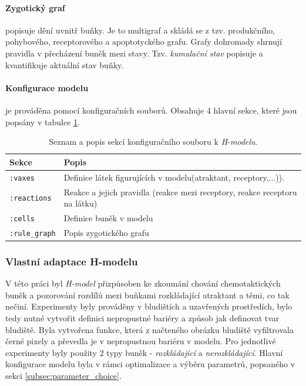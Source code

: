 \documentclass[10pt,a4paper,twocolumn]{article}
\begin{document}
\paragraph{Zygotický graf} popisuje dění uvnitř buňky. Je to multigraf a skládá se z tzv. produkčního, pohybového, receptorového a apoptotyckého grafu. Grafy dohromady shrnují pravidla v přecházení buněk mezi stavy. Tzv. \textit{kumulační stav} popisuje a kvantifikuje aktuální stav buňky.

\paragraph{Konfigurace modelu} je prováděna pomocí konfiguračních souborů. Obsahuje 4 hlavní sekce, které jsou popsány v tabulce \ref{table:sekce}.


\begin{table}[t]
  \centering %
  \begin{tabular}{l p{5cm}}
  \toprule
  Sekce & Popis \\
  \midrule
    \texttt{:vaxes} & Definice látek figurujících v modelu(atraktant, receptory,...)). \\
    \texttt{:reactions} & Reakce a jejich pravidla (reakce mezi receptory, reakce receptoru na látku)\\
    \texttt{:cells} & Definice buněk v modelu\\	
    \texttt{:rule\_graph} & Popis zygotického grafu\\	
    
  \bottomrule
  \end{tabular}
  \caption{Seznam a popis sekcí konfiguračního souboru k \textit{H-modelu}.} \label{table:sekce} 
\end{table}

\subsubsection{Vlastní adaptace H-modelu}
V této práci byl \textit{H-model} přizpůsoben ke zkoumání chování chemotaktických buněk a pozorování rozdílů mezi buňkami rozkládající atraktant a těmi, co tak nečiní. Experimenty byly prováděny v bludištích a uzavřených prostředích, bylo tedy nutné vytvořit definici nepropustné bariéry a způsob jak definovat tvar bludiště. Byla vytvořena funkce, která z načteného obrázku bludiště vyfiltrovala černé pixely a převedla je v nepropustnou bariéru v modelu. Pro jednotlivé experimenty byly použity 2 typy buněk - \textit{rozkládající} a \textit{nerozkládající}. Hlavní konfigurace modelu byla v rámci optimalizace a výběru parametrů, popsaného v sekci \ref{subsec:parameter_choice}.
\end{document}
